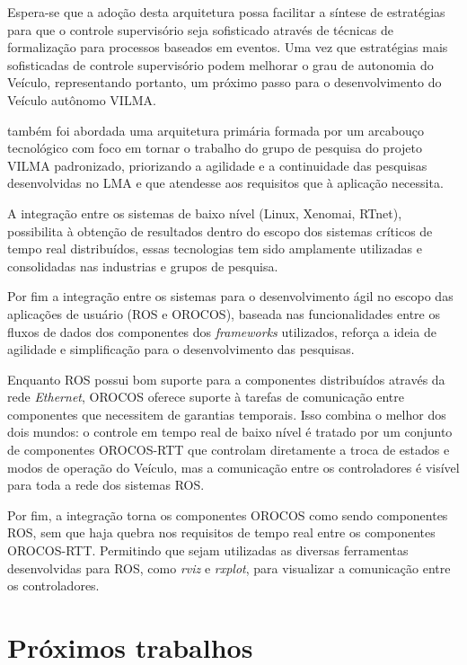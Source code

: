 \documentclass[conference]{IEEEtran}
\begin{document}
Espera-se que a adoção desta arquitetura possa facilitar a síntese de estratégias para que o controle supervisório seja sofisticado através de técnicas de formalização para processos baseados em eventos. Uma vez que estratégias mais sofisticadas de controle supervisório podem melhorar o grau de autonomia do Veículo, representando portanto, um próximo passo para o desenvolvimento do Veículo autônomo VILMA.

também foi abordada uma arquitetura primária formada por um arcabouço tecnológico com foco em tornar o trabalho do grupo de pesquisa do projeto VILMA padronizado, priorizando a agilidade e a continuidade das pesquisas desenvolvidas no LMA e que atendesse aos requisitos que à aplicação necessita. 

A integração entre os sistemas de baixo nível (Linux, Xenomai, RTnet), possibilita à obtenção de resultados dentro do escopo dos sistemas críticos de tempo real distribuídos, essas tecnologias tem sido amplamente utilizadas e consolidadas nas industrias e grupos de pesquisa. 

Por fim a integração entre os sistemas para o desenvolvimento ágil no escopo das aplicações de usuário (ROS e OROCOS), baseada nas funcionalidades entre os fluxos de dados dos componentes dos \textit{frameworks} utilizados, reforça a ideia de agilidade e simplificação para o desenvolvimento das pesquisas.

Enquanto ROS possui bom suporte para a componentes distribuídos através da rede \textit{Ethernet}, OROCOS oferece suporte à tarefas de comunicação entre componentes que necessitem de garantias temporais. Isso combina o melhor dos dois mundos: o controle em tempo real de baixo nível é tratado por um conjunto de componentes OROCOS-RTT que controlam diretamente a troca de estados e modos de operação do Veículo, mas a comunicação entre os controladores é visível para toda a rede dos sistemas ROS.

Por fim, a integração torna os componentes OROCOS como sendo componentes ROS, sem que haja quebra nos requisitos de tempo real entre os componentes OROCOS-RTT. Permitindo que sejam utilizadas as diversas ferramentas desenvolvidas para ROS, como \textit{rviz} e \textit{rxplot}, para visualizar a comunicação entre os controladores.

\section{Próximos trabalhos}\label{sec:next_works}
\end{document}
